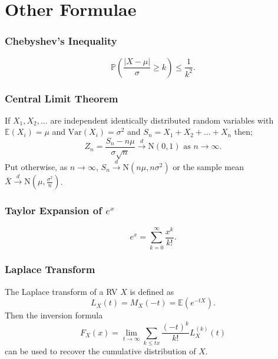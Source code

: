 \documentclass[titlepage,twocolumn]{article}
\begin{document}
\section*{Other Formulae}
\subsubsection*{Chebyshev's Inequality}
$$\mathbb{P}\left(\frac{|X-\mu|}{\sigma} \geq k\right) \leq \frac{1}{k^2}.$$
\subsubsection*{Central Limit Theorem}
If $X_1, X_2,\dots$ are independent identically distributed random variables with $\mathbb{E}(X_i)=\mu$ and $\mbox{Var}(X_i)=\sigma^2$ and $S_n = X_1 + X_2 + \dots + X_n$ then;
$$Z_n = \frac{S_n - n\mu}{\sigma \sqrt{n}} \stackrel{d}{\rightarrow} \mbox{N}(0,1) \mbox{ as } n\rightarrow \infty.$$ Put otherwise, as $n \rightarrow \infty$, $S_n \stackrel{d}{\rightarrow} \mbox{N}(n\mu, n\sigma^2)$ or the sample mean $\overline{X} \stackrel{d}{\rightarrow} \mbox{N}(\mu, \frac{\sigma^2}{n})$.
\subsubsection*{Taylor Expansion of $e^x$}
$$e^x = \sum_{k=0}^{\infty}\frac{x^k}{k!}.$$
\subsubsection*{Laplace Transform}
The Laplace transform of a RV $X$ is defined as $$L_X(t)=M_X(-t)=\mathbb{E}(e^{-tX}).$$ Then the inversion formula $$F_X(x) = \lim_{t\rightarrow \infty} \sum_{k\leq tx} \frac{(-t)^k}{k!}L_X^{(k)}(t)$$ can be used to recover the cumulative distribution of $X$.
\end{document}
